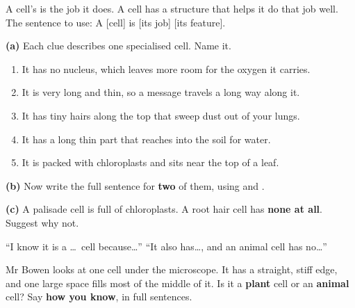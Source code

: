 \documentclass[12pt,a4paper]{article}
\begin{document}

\begin{remember}
  A cell's  is the job it does. A  cell has a
  structure that helps it do that job well. The sentence to use:\quad
  A [cell] is  [its job]  [its feature].
\end{remember}

\noindent \textbf{(a)} Each clue describes one specialised cell. Name it.

\vspace{4pt}
\begin{enumerate}[label=(\roman*), itemsep=7pt]
  \item It has no nucleus, which leaves more room for the oxygen it carries.
        \blank[3.6cm]
  \item It is very long and thin, so a message travels a long way along it.
        \blank[3.6cm]
  \item It has tiny hairs along the top that sweep dust out of your lungs.
        \blank[3.6cm]
  \item It has a long thin part that reaches into the soil for water.
        \blank[3.6cm]
  \item It is packed with chloroplasts and sits near the top of a leaf.
        \blank[3.6cm]
\end{enumerate}

\vspace{4pt}
\noindent \textbf{(b)} Now write the full sentence for \textbf{two} of them, using
 and .

\vspace{6pt}
\noindent \textbf{(c)} A palisade cell is full of chloroplasts. A root hair cell has
\textbf{none at all}. Suggest why not.


\begin{wordhelp}
  ``I know it is a \ldots\ cell because\ldots'' \qquad
  ``It also has\ldots, and an animal cell has no\ldots''
\end{wordhelp}

\noindent Mr Bowen looks at one cell under the microscope. It has a straight, stiff
edge, and one large space fills most of the middle of it. Is it a \textbf{plant} cell
or an \textbf{animal} cell? Say \textbf{how you know}, in full sentences.
\end{document}
